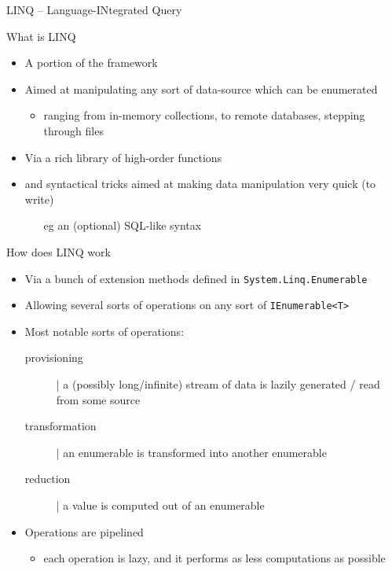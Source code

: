 \documentclass[presentation]{beamer}
\begin{document}
\begin{frame}[allowframebreaks]{LINQ -- Language-INtegrated Query}
  \begin{block}{What is LINQ}
    \begin{itemize}
      \item A portion of the \dotnet framework
      \item Aimed at manipulating any sort of data-source which can be enumerated
      \begin{itemize}
        \item ranging from in-memory collections, to remote databases, stepping through files
      \end{itemize}
      \item Via a rich library of high-order functions
      \item and syntactical tricks aimed at making data manipulation very quick (to write)
      \begin{itemize}
        \item[eg] an (optional) SQL-like syntax
      \end{itemize}
    \end{itemize}
  \end{block}

  \begin{block}{How does LINQ work}
    \begin{itemize}
      \item Via a bunch of extension methods defined in \texttt{System.Linq.\alert{Enumerable}}
      \item Allowing several sorts of operations on any sort of \texttt{IEnumerable<T>}
      \item Most notable sorts of operations:
      \begin{description}
        \item[provisioning] | a (possibly long/infinite) stream of data is lazily generated / read from some source
        \item[transformation] | an enumerable is transformed into another enumerable
        \item[reduction] | a value is computed out of an enumerable 
      \end{description} 
      \item Operations are \alert{pipelined}
      \begin{itemize}
        \item each operation is lazy, and it performs as less computations as possible
      \end{itemize}
    \end{itemize}
  \end{block}


\end{frame}
\end{document}
